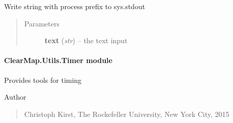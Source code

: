 \documentclass[letterpaper,10pt,english]{sphinxmanual}
\begin{document}
\begin{fulllineitems}

\begin{fulllineitems}
\label{api/ClearMap.Utils:ClearMap.Utils.ProcessWriter.ProcessWriter.write}
Write string with process prefix to sys.stdout
\begin{quote}\begin{description}
\item[{Parameters}] \leavevmode
\textbf{text} (\emph{str}) --
the text input

\end{description}\end{quote}

\end{fulllineitems}


\end{fulllineitems}



\paragraph{ClearMap.Utils.Timer module}
\label{api/ClearMap.Utils:module-ClearMap.Utils.Timer}\label{api/ClearMap.Utils:clearmap-utils-timer-module}
Provides tools for timing

Author
\begin{quote}

Christoph Kirst, The Rockefeller University, New York City, 2015
\end{quote}
\end{document}

